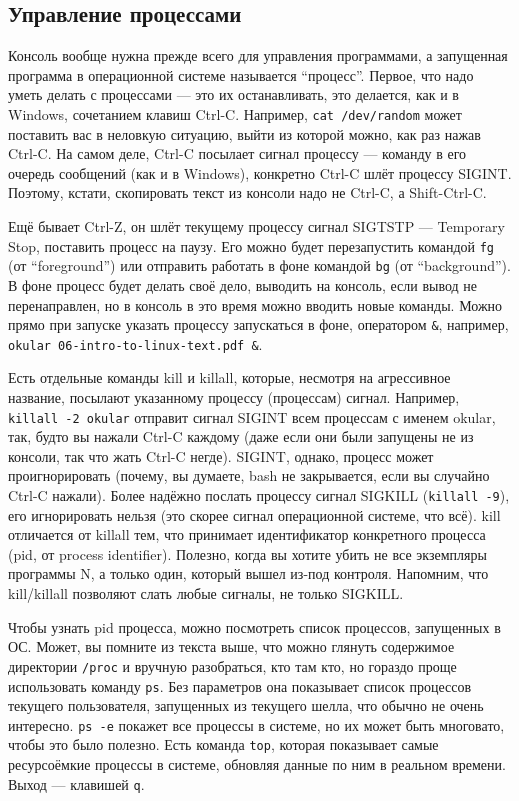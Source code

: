 \documentclass{../../text-style}
\begin{document}
\subsection{Управление процессами}

Консоль вообще нужна прежде всего для управления программами, а запущенная программа в операционной системе называется \enquote{процесс}. 
Первое, что надо уметь делать с процессами --- это их останавливать, это делается, как и в Windows, сочетанием клавиш Ctrl-C.
Например, \verb|cat /dev/random| может поставить вас в неловкую ситуацию, выйти из которой можно, как раз нажав Ctrl-C.
На самом деле, Ctrl-C посылает сигнал процессу --- команду в его очередь сообщений (как и в Windows), конкретно Ctrl-C шлёт процессу SIGINT.
Поэтому, кстати, скопировать текст из консоли надо не Ctrl-C, а Shift-Ctrl-C.

Ещё бывает Ctrl-Z, он шлёт текущему процессу сигнал SIGTSTP --- Temporary Stop, поставить процесс на паузу.
Его можно будет перезапустить командой \verb|fg| (от \enquote{foreground}) или отправить работать в фоне командой \verb|bg| (от \enquote{background}).
В фоне процесс будет делать своё дело, выводить на консоль, если вывод не перенаправлен, но в консоль в это время можно вводить новые команды.
Можно прямо при запуске указать процессу запускаться в фоне, оператором \verb|&|, например, \verb|okular 06-intro-to-linux-text.pdf &|.

Есть отдельные команды kill и killall, которые, несмотря на агрессивное название, посылают указанному процессу (процессам) сигнал.
Например, \verb|killall -2 okular| отправит сигнал SIGINT всем процессам с именем okular, так, будто вы нажали Ctrl-C каждому (даже если они были запущены не из консоли, так что жать Ctrl-C негде).
SIGINT, однако, процесс может проигнорировать (почему, вы думаете, bash не закрывается, если вы случайно Ctrl-C нажали).
Более надёжно послать процессу сигнал SIGKILL (\verb|killall -9|), его игнорировать нельзя (это скорее сигнал операционной системе, что всё).
kill отличается от killall тем, что принимает идентификатор конкретного процесса (pid, от process identifier).
Полезно, когда вы хотите убить не все экземпляры программы N, а только один, который вышел из-под контроля.
Напомним, что kill/killall позволяют слать любые сигналы, не только SIGKILL.

Чтобы узнать pid процесса, можно посмотреть список процессов, запущенных в ОС.
Может, вы помните из текста выше, что можно глянуть содержимое директории \verb|/proc| и вручную разобраться, кто там кто, но гораздо проще использовать команду \verb|ps|.
Без параметров она показывает список процессов текущего пользователя, запущенных из текущего шелла, что обычно не очень интересно.
\verb|ps -e| покажет все процессы в системе, но их может быть многовато, чтобы это было полезно.
Есть команда \verb|top|, которая показывает самые ресурсоёмкие процессы в системе, обновляя данные по ним в реальном времени.
Выход --- клавишей \verb|q|.
\end{document}
